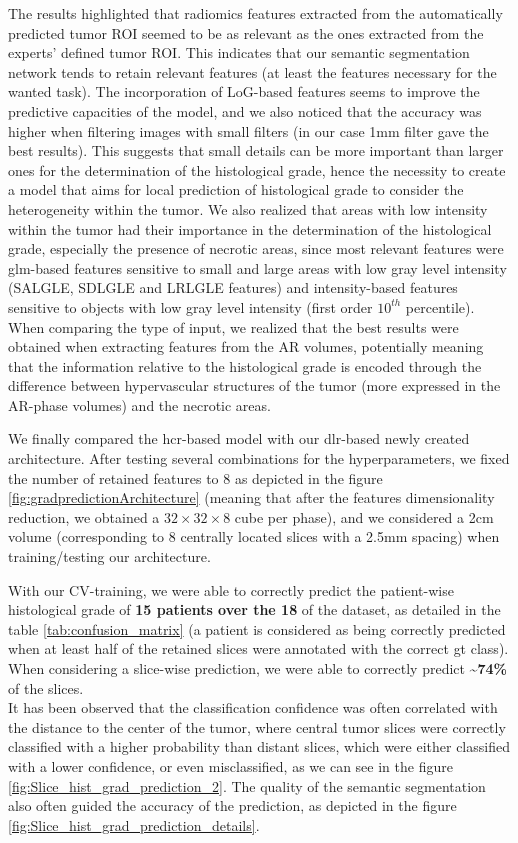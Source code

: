 The results highlighted that radiomics features extracted from the automatically predicted tumor ROI seemed to be as relevant as the ones extracted from the experts' defined tumor ROI. This indicates that our semantic segmentation network tends to retain relevant features (at least the features necessary for the wanted task).
The incorporation of LoG-based features seems to improve the predictive capacities of the model, and we also noticed that the accuracy was higher when filtering images with small filters (in our case 1mm filter gave the best results). This suggests that small details can be more important than larger ones for the determination of the histological grade, hence the necessity to create a model that aims for local prediction of histological grade to consider the heterogeneity within the tumor. We also realized that areas with low intensity within the tumor had their importance in the determination of the histological grade, especially the presence of necrotic areas, since most relevant features were glm-based features sensitive to small and large areas with low gray level intensity (SALGLE, SDLGLE and LRLGLE features) and intensity-based features sensitive to objects with low gray level intensity (first order $10^{th}$ percentile). 
When comparing the type of input, we realized that the best results were obtained when extracting features from the AR volumes, potentially meaning that the information relative to the histological grade is encoded through the difference between hypervascular structures of the tumor (more expressed in the AR-phase volumes) and the necrotic areas.


We finally compared the \ac{hcr}-based model with our \ac{dlr}-based newly created architecture.
After testing several combinations for the hyperparameters, we
fixed the number of retained features to 8 as depicted in the
figure \ref{fig:gradpredictionArchitecture} (meaning that after the features dimensionality reduction,
we obtained a $ 32\times32\times8 $ cube per phase), and we considered a 2cm volume
(corresponding to 8 centrally located slices with a 2.5mm spacing) when
training/testing our architecture.

With our CV-training, we were able to correctly predict the patient-wise
histological grade of \textbf{15 patients over the 18} of the dataset, as detailed in the table \ref{tab:confusion_matrix} (a patient is considered as being correctly predicted
when at least half of the retained slices were annotated with the
correct \ac{gt} class).
When considering a slice-wise prediction, we were able to correctly
predict \textbf{\textasciitilde{}74\%} of the slices.\\
It has been observed that the classification confidence was often correlated with the distance to the center of the tumor, where central tumor slices were correctly classified with a higher probability than distant slices, which were either classified with a lower confidence, or even misclassified, as we can see in the figure \ref{fig:Slice_hist_grad_prediction_2}. The quality of the semantic segmentation also often guided the accuracy of the prediction, as depicted in the figure \ref{fig:Slice_hist_grad_prediction_details}.

